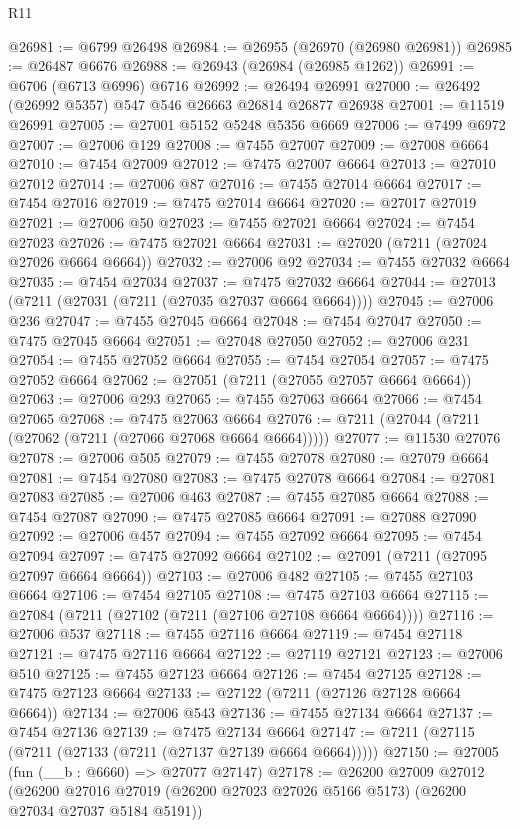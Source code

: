 \begin{lexlean}{R11}
\begin{coremodule}
@26981 := @6799 @26498
@26984 := @26955 (@26970 (@26980 @26981))
@26985 := @26487 @6676
@26988 := @26943 (@26984 (@26985 @1262))
@26991 := @6706 (@6713 @6996) @6716
@26992 := @26494 @26991
@27000 := @26492 (@26992 @5357) @547 @546 @26663 @26814 @26877 @26938
@27001 := @11519 @26991
@27005 := @27001 @5152 @5248 @5356 @6669
@27006 := @7499 @6972
@27007 := @27006 @129
@27008 := @7455 @27007
@27009 := @27008 @6664
@27010 := @7454 @27009
@27012 := @7475 @27007 @6664
@27013 := @27010 @27012
@27014 := @27006 @87
@27016 := @7455 @27014 @6664
@27017 := @7454 @27016
@27019 := @7475 @27014 @6664
@27020 := @27017 @27019
@27021 := @27006 @50
@27023 := @7455 @27021 @6664
@27024 := @7454 @27023
@27026 := @7475 @27021 @6664
@27031 := @27020 (@7211 (@27024 @27026 @6664 @6664))
@27032 := @27006 @92
@27034 := @7455 @27032 @6664
@27035 := @7454 @27034
@27037 := @7475 @27032 @6664
@27044 := @27013 (@7211 (@27031 (@7211 (@27035 @27037 @6664 @6664))))
@27045 := @27006 @236
@27047 := @7455 @27045 @6664
@27048 := @7454 @27047
@27050 := @7475 @27045 @6664
@27051 := @27048 @27050
@27052 := @27006 @231
@27054 := @7455 @27052 @6664
@27055 := @7454 @27054
@27057 := @7475 @27052 @6664
@27062 := @27051 (@7211 (@27055 @27057 @6664 @6664))
@27063 := @27006 @293
@27065 := @7455 @27063 @6664
@27066 := @7454 @27065
@27068 := @7475 @27063 @6664
@27076 := @7211 (@27044 (@7211 (@27062 (@7211 (@27066 @27068 @6664 @6664)))))
@27077 := @11530 @27076
@27078 := @27006 @505
@27079 := @7455 @27078
@27080 := @27079 @6664
@27081 := @7454 @27080
@27083 := @7475 @27078 @6664
@27084 := @27081 @27083
@27085 := @27006 @463
@27087 := @7455 @27085 @6664
@27088 := @7454 @27087
@27090 := @7475 @27085 @6664
@27091 := @27088 @27090
@27092 := @27006 @457
@27094 := @7455 @27092 @6664
@27095 := @7454 @27094
@27097 := @7475 @27092 @6664
@27102 := @27091 (@7211 (@27095 @27097 @6664 @6664))
@27103 := @27006 @482
@27105 := @7455 @27103 @6664
@27106 := @7454 @27105
@27108 := @7475 @27103 @6664
@27115 := @27084 (@7211 (@27102 (@7211 (@27106 @27108 @6664 @6664))))
@27116 := @27006 @537
@27118 := @7455 @27116 @6664
@27119 := @7454 @27118
@27121 := @7475 @27116 @6664
@27122 := @27119 @27121
@27123 := @27006 @510
@27125 := @7455 @27123 @6664
@27126 := @7454 @27125
@27128 := @7475 @27123 @6664
@27133 := @27122 (@7211 (@27126 @27128 @6664 @6664))
@27134 := @27006 @543
@27136 := @7455 @27134 @6664
@27137 := @7454 @27136
@27139 := @7475 @27134 @6664
@27147 := @7211 (@27115 (@7211 (@27133 (@7211 (@27137 @27139 @6664 @6664)))))
@27150 := @27005 (fun (__b : @6660) => @27077 @27147)
@27178 := @26200
    @27009
    @27012
    (@26200 @27016 @27019 (@26200 @27023 @27026 @5166 @5173) (@26200 @27034 @27037 @5184 @5191))

\end{coremodule}
\end{lexlean}
